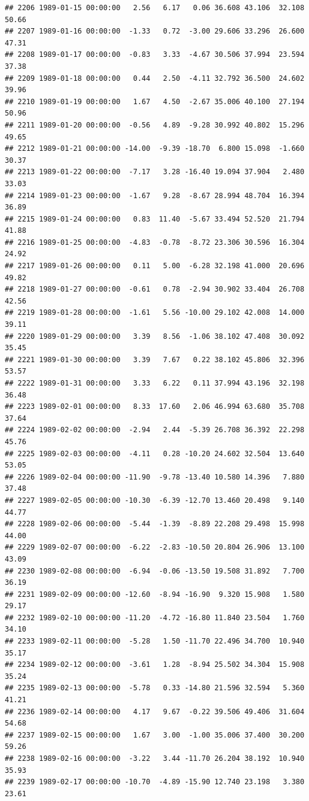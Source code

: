 \documentclass{article}\usepackage{graphicx, color}
\makeatletter
\newenvironment{kframe}{%
 \def\at@end@of@kframe{}%
 \ifinner\ifhmode%
  \def\at@end@of@kframe{\end{minipage}}%
  \begin{minipage}{\columnwidth}%
 \fi\fi%
 \def\FrameCommand##1{\hskip\@totalleftmargin \hskip-\fboxsep
 \colorbox{shadecolor}{##1}\hskip-\fboxsep
     \hskip-\linewidth \hskip-\@totalleftmargin \hskip\columnwidth}%
 \MakeFramed {\advance\hsize-\width
   \@totalleftmargin\z@ \linewidth\hsize
   \@setminipage}}%
 {\par\unskip\endMakeFramed%
 \at@end@of@kframe}
\newenvironment{knitrout}{}{} %
\makeatother
\begin{document}
\begin{knitrout}
\begin{kframe}
\begin{verbatim}
## 2206 1989-01-15 00:00:00   2.56   6.17   0.06 36.608 43.106  32.108  50.66
## 2207 1989-01-16 00:00:00  -1.33   0.72  -3.00 29.606 33.296  26.600  47.31
## 2208 1989-01-17 00:00:00  -0.83   3.33  -4.67 30.506 37.994  23.594  37.38
## 2209 1989-01-18 00:00:00   0.44   2.50  -4.11 32.792 36.500  24.602  39.96
## 2210 1989-01-19 00:00:00   1.67   4.50  -2.67 35.006 40.100  27.194  50.96
## 2211 1989-01-20 00:00:00  -0.56   4.89  -9.28 30.992 40.802  15.296  49.65
## 2212 1989-01-21 00:00:00 -14.00  -9.39 -18.70  6.800 15.098  -1.660  30.37
## 2213 1989-01-22 00:00:00  -7.17   3.28 -16.40 19.094 37.904   2.480  33.03
## 2214 1989-01-23 00:00:00  -1.67   9.28  -8.67 28.994 48.704  16.394  36.89
## 2215 1989-01-24 00:00:00   0.83  11.40  -5.67 33.494 52.520  21.794  41.88
## 2216 1989-01-25 00:00:00  -4.83  -0.78  -8.72 23.306 30.596  16.304  24.92
## 2217 1989-01-26 00:00:00   0.11   5.00  -6.28 32.198 41.000  20.696  49.82
## 2218 1989-01-27 00:00:00  -0.61   0.78  -2.94 30.902 33.404  26.708  42.56
## 2219 1989-01-28 00:00:00  -1.61   5.56 -10.00 29.102 42.008  14.000  39.11
## 2220 1989-01-29 00:00:00   3.39   8.56  -1.06 38.102 47.408  30.092  35.45
## 2221 1989-01-30 00:00:00   3.39   7.67   0.22 38.102 45.806  32.396  53.57
## 2222 1989-01-31 00:00:00   3.33   6.22   0.11 37.994 43.196  32.198  36.48
## 2223 1989-02-01 00:00:00   8.33  17.60   2.06 46.994 63.680  35.708  37.64
## 2224 1989-02-02 00:00:00  -2.94   2.44  -5.39 26.708 36.392  22.298  45.76
## 2225 1989-02-03 00:00:00  -4.11   0.28 -10.20 24.602 32.504  13.640  53.05
## 2226 1989-02-04 00:00:00 -11.90  -9.78 -13.40 10.580 14.396   7.880  37.48
## 2227 1989-02-05 00:00:00 -10.30  -6.39 -12.70 13.460 20.498   9.140  44.77
## 2228 1989-02-06 00:00:00  -5.44  -1.39  -8.89 22.208 29.498  15.998  44.00
## 2229 1989-02-07 00:00:00  -6.22  -2.83 -10.50 20.804 26.906  13.100  43.09
## 2230 1989-02-08 00:00:00  -6.94  -0.06 -13.50 19.508 31.892   7.700  36.19
## 2231 1989-02-09 00:00:00 -12.60  -8.94 -16.90  9.320 15.908   1.580  29.17
## 2232 1989-02-10 00:00:00 -11.20  -4.72 -16.80 11.840 23.504   1.760  34.10
## 2233 1989-02-11 00:00:00  -5.28   1.50 -11.70 22.496 34.700  10.940  35.17
## 2234 1989-02-12 00:00:00  -3.61   1.28  -8.94 25.502 34.304  15.908  35.24
## 2235 1989-02-13 00:00:00  -5.78   0.33 -14.80 21.596 32.594   5.360  41.21
## 2236 1989-02-14 00:00:00   4.17   9.67  -0.22 39.506 49.406  31.604  54.68
## 2237 1989-02-15 00:00:00   1.67   3.00  -1.00 35.006 37.400  30.200  59.26
## 2238 1989-02-16 00:00:00  -3.22   3.44 -11.70 26.204 38.192  10.940  35.93
## 2239 1989-02-17 00:00:00 -10.70  -4.89 -15.90 12.740 23.198   3.380  23.61

\end{verbatim}
\end{kframe}
\end{knitrout}
\end{document}
